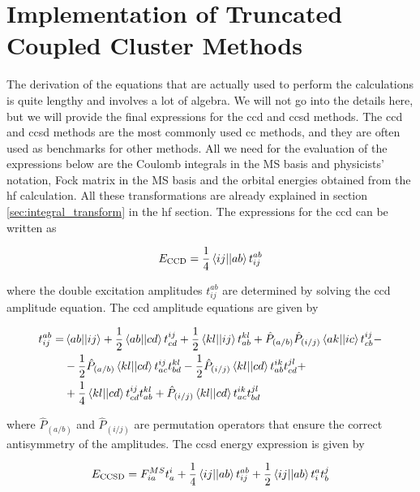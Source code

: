 \section{Implementation of Truncated Coupled Cluster Methods}

The derivation of the equations that are actually used to perform the calculations is quite lengthy and involves a lot of algebra. We will not go into the details here, but we will provide the final expressions for the \acrshort{ccd} and \acrshort{ccsd} methods.\cite{10.1063/1.460620} The \acrshort{ccd} and \acrshort{ccsd} methods are the most commonly used \acrshort{cc} methods, and they are often used as benchmarks for other methods. All we need for the evaluation of the expressions below are the Coulomb integrals in the MS basis and physicists' notation, Fock matrix in the MS basis and the orbital energies obtained from the \acrshort{hf} calculation. All these transformations are already explained in section \ref{sec:integral_transform} in the \acrshort{hf} section. The expressions for the \acrshort{ccd} can be written as

\begin{equation}
E_{\text{CCD}}=\frac{1}{4}\braket{ij||ab}t_{ij}^{ab}
\end{equation}

where the double excitation amplitudes \(t_{ij}^{ab}\) are determined by solving the \acrshort{ccd} amplitude equation. The \acrshort{ccd} amplitude equations are given by

\begin{align}
t_{ij}^{ab}=&\braket{ab||ij}+\frac{1}{2}\braket{ab||cd}t_{cd}^{ij}+\frac{1}{2}\braket{kl||ij}t_{ab}^{kl}+\hat{P}_{(a/b)}\hat{P}_{(i/j)}\braket{ak||ic}t_{cb}^{ij}-\nonumber \\
&-\frac{1}{2}\hat{P}_{(a/b)}\braket{kl||cd}t_{ac}^{ij}t_{bd}^{kl}-\frac{1}{2}\hat{P}_{(i/j)}\braket{kl||cd}t_{ab}^{ik}t_{cd}^{jl}+\nonumber \\
&+\frac{1}{4}\braket{kl||cd}t_{cd}^{ij}t_{ab}^{kl}+\hat{P}_{(i/j)}\braket{kl||cd}t_{ac}^{ik}t_{bd}^{jl}
\end{align}

where \(\hat{P}_{(a/b)}\) and \(\hat{P}_{(i/j)}\) are permutation operators that ensure the correct antisymmetry of the amplitudes. The \acrshort{ccsd} energy expression is given by

\begin{equation}
E_{\text{CCSD}}=F_{ia}^{MS}t_a^i+\frac{1}{4}\braket{ij||ab}t_{ij}^{ab}+\frac{1}{2}\braket{ij||ab}t_{i}^{a}t_{b}^{j}
\end{equation}


